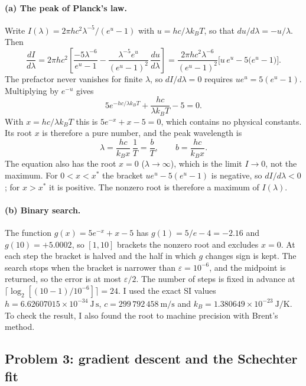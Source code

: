 \documentclass[11pt]{article}
\newcommand{\eps}{\varepsilon}
\begin{document}
\paragraph{(a) The peak of Planck's law.}
Write $I(\lambda) = 2\pi hc^2\lambda^{-5}/(e^{u}-1)$ with $u = hc/\lambda k_BT$,
so that $du/d\lambda = -u/\lambda$. Then
\[
\frac{dI}{d\lambda}
= 2\pi hc^2\left[\frac{-5\lambda^{-6}}{e^{u}-1}
  - \frac{\lambda^{-5}e^{u}}{(e^{u}-1)^2}\,\frac{du}{d\lambda}\right]
= \frac{2\pi hc^2\lambda^{-6}}{(e^{u}-1)^2}\Big[u\,e^{u} - 5\big(e^{u}-1\big)\Big].
\]
The prefactor never vanishes for finite $\lambda$, so $dI/d\lambda = 0$ requires
$ue^{u} = 5(e^{u}-1)$. Multiplying by $e^{-u}$ gives
\[
5e^{-hc/\lambda k_BT} + \frac{hc}{\lambda k_BT} - 5 = 0 .
\]
With $x = hc/\lambda k_BT$ this is $5e^{-x}+x-5=0$, which contains no physical
constants. Its root $x$ is therefore a pure number, and the peak wavelength is
\[
\lambda = \frac{hc}{k_B x}\,\frac{1}{T} = \frac{b}{T},\qquad
b = \frac{hc}{k_B x} .
\]
The equation also has the root $x=0$ ($\lambda\to\infty$), which is the limit
$I\to0$, not the maximum. For $0<x<x^*$ the bracket $ue^u-5(e^u-1)$ is negative,
so $dI/d\lambda<0$; for $x>x^*$ it is positive. The nonzero root is therefore a
maximum of $I(\lambda)$.

\paragraph{(b) Binary search.}
The function $g(x) = 5e^{-x}+x-5$ has $g(1) = 5/e-4 = -2.16$ and
$g(10) = +5.0002$, so $[1,10]$ brackets the nonzero root and excludes $x=0$.
At each step the bracket is halved and the half in which $g$ changes sign is
kept. The search stops when the bracket is narrower than $\eps = 10^{-6}$, and
the midpoint is returned, so the error is at most $\eps/2$. The number of steps
is fixed in advance at $\lceil\log_2[(10-1)/10^{-6}]\rceil = 24$. I used the
exact SI values $h = 6.62607015\times10^{-34}\ \mathrm{J\,s}$,
$c = 299\,792\,458\ \mathrm{m/s}$ and $k_B = 1.380649\times10^{-23}\ \mathrm{J/K}$.
To check the result, I also found the root to machine precision with Brent's method.


\subsection*{Problem 3: gradient descent and the Schechter fit}
\end{document}
